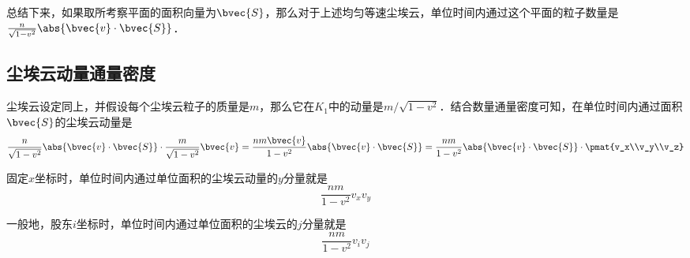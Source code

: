 总结下来，如果取所考察平面的面积向量为$\bvec{S}$，那么对于上述均匀等速尘埃云，单位时间内通过这个平面的粒子数量是$\frac{n}{\sqrt{1-v^2}}\abs{\bvec{v}\cdot\bvec{S}}$．

\subsection{尘埃云动量通量密度}

尘埃云设定同上，并假设每个尘埃云粒子的质量是$m$，那么它在$K_1$中的动量是$m/\sqrt{1-v^2}$．结合数量通量密度可知，在单位时间内通过面积$\bvec{S}$的尘埃云动量是
\begin{equation}
\frac{n}{\sqrt{1-v^2}}\abs{\bvec{v}\cdot\bvec{S}}\cdot\frac{m}{\sqrt{1-v^2}}\bvec{v}=\frac{nm\bvec{v}}{1-v^2}\abs{\bvec{v}\cdot\bvec{S}}=\frac{nm}{1-v^2}\abs{\bvec{v}\cdot\bvec{S}}\cdot\pmat{v_x\\v_y\\v_z}
\end{equation}

固定$x$坐标时，单位时间内通过单位面积的尘埃云动量的$y$分量就是
\begin{equation}
\frac{nm}{1-v^2}v_xv_y
\end{equation}

一般地，股东$i$坐标时，单位时间内通过单位面积的尘埃云的$j$分量就是
\begin{equation}
\frac{nm}{1-v^2}v_iv_j
\end{equation}





